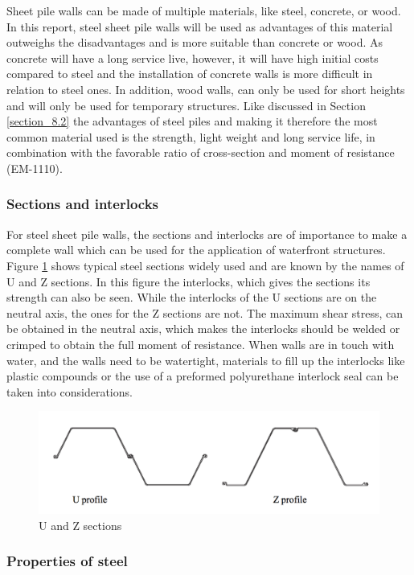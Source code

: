 Sheet pile walls can be made of multiple materials, like steel, concrete, or wood. In this report, steel sheet pile walls will be used as advantages of this material outweighs the disadvantages and is more suitable than concrete or wood. As concrete will have a long service live, however, it will have high initial costs compared to steel and the installation of concrete walls is more difficult in relation to steel ones. In addition, wood walls, can only be used for short heights and will only be used for temporary structures. Like discussed in Section \ref{section_8.2} the advantages of steel piles and making it therefore the most common material used is the strength, light weight and long service life, in combination with the favorable ratio of cross-section and moment of resistance (EM-1110).

\subsubsection{Sections and interlocks}

For steel sheet pile walls, the sections and interlocks are of importance to make a complete wall which can be used for the application of waterfront structures. Figure \ref{fig:sections_sheetpiles} shows typical steel sections widely used and are known by the names of U and Z sections. In this figure the interlocks, which gives the sections its strength can also be seen. While the interlocks of the U sections are on the neutral axis, the ones for the Z sections are not. The maximum shear stress, can be obtained in the neutral axis, which makes the interlocks should be welded or crimped to obtain the full moment of resistance. When walls are in touch with water, and the walls need to be watertight, materials to fill up the interlocks like plastic compounds or the use of a preformed polyurethane interlock seal can be taken into considerations. 

\begin{figure}[H]
    \centering
    \includegraphics[width=0.50\linewidth]{figures/ch8/u_profile_z_profile.png}
    \caption{U and Z sections}
    \label{fig:sections_sheetpiles}
\end{figure}

\subsubsection{Properties of steel}

